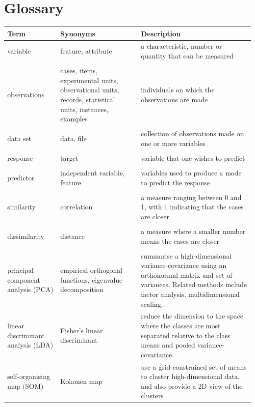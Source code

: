 \documentclass[
  letterpaper,
]{krantz}
\begin{document}
\chapter{Glossary}\label{glossary}

\begin{table}
\centering\centering
\begin{tabular}{>{\raggedright\arraybackslash}p{2cm}>{\raggedright\arraybackslash}p{4cm}>{\raggedright\arraybackslash}p{6cm}}
\toprule
Term & Synonyms & Description\\
\midrule
variable & feature, attribute & a characteristic, number or quantity that can be measured\\
\midrule\\
observations & cases, items, experimental units, observational units, records, statistical units, instances, examples & individuals on which the observations are made\\
\midrule\\
data set & data, file & collection of observations made on one or more variables\\
\midrule\\
response & target & variable that one wishes to predict\\
\midrule\\
predictor & independent variable, feature & variables used to produce a mode to predict the response\\
\midrule\\
\addlinespace
similarity & correlation & a measure ranging between 0 and 1, with 1 indicating that the cases are closer\\
\midrule\\
dissimilarity & distance & a measure where a smaller number means the cases are closer\\
\midrule\\
principal component analysis (PCA) & empirical orthogonal functions, eigenvalue decomposition & summarise a high-dimensional variance-covariance using an orthonormal matrix and set of variances. Related methods include factor analysis, multidimensional scaling.\\
\midrule
linear discriminant analysis (LDA) & Fisher's linear discriminant & reduce the dimension to the space where the classes are most separated relative to the class means and pooled variance-covariance.\\
\midrule
self-organising map (SOM) & Kohonen map & use a grid-constrained set of means to cluster high-dimensional data, and also provide a 2D view of the clusters\\
\bottomrule
\end{tabular}
\end{table}



\printindex
\end{document}
